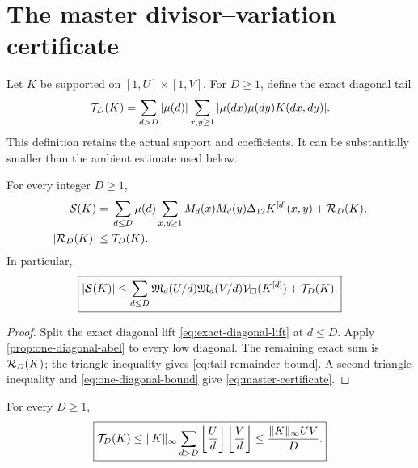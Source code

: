 \section{The master divisor--variation certificate}
\label{sec:master-certificate}

Let \(K\) be supported on
\([1,U]\times[1,V]\).  For \(D\ge1\), define the exact diagonal tail
\begin{equation}
 \mathcal T_D(K)
 =
 \sum_{d>D}|\mu(d)|
 \sum_{x,y\ge1}
 |\mu(dx)\mu(dy)K(dx,dy)|.
\label{eq:exact-diagonal-tail}
\end{equation}
This definition retains the actual support and coefficients.  It can be
substantially smaller than the ambient estimate used below.

\begin{theorem}
\label{thm:master-certificate}
For every integer \(D\ge1\),
\begin{align}
 \mathcal S(K)
 ={}&
 \sum_{d\le D}\mu(d)
 \sum_{x,y\ge1}
 M_d(x)M_d(y)\Delta_{12}K^{[d]}(x,y)
 +\mathcal R_D(K),
\label{eq:exact-truncated-expansion}\\
 |\mathcal R_D(K)|
 \le{}&\mathcal T_D(K).
\label{eq:tail-remainder-bound}
\end{align}
In particular,
\begin{equation}
 \boxed{
 |\mathcal S(K)|
 \le
 \sum_{d\le D}
 \mathfrak M_d(U/d)\mathfrak M_d(V/d)
 \mathcal V_\square(K^{[d]})
 +\mathcal T_D(K).}
\label{eq:master-certificate}
\end{equation}
\end{theorem}

\begin{proof}
Split the exact diagonal lift
\eqref{eq:exact-diagonal-lift} at \(d\le D\).  Apply
\cref{prop:one-diagonal-abel} to every low diagonal.  The remaining exact
sum is \(\mathcal R_D(K)\); the triangle inequality gives
\eqref{eq:tail-remainder-bound}.  A second triangle inequality and
\eqref{eq:one-diagonal-bound} give \eqref{eq:master-certificate}.
\end{proof}

\begin{proposition}
\label{prop:ambient-tail}
For every \(D\ge1\),
\begin{equation}
 \boxed{
 \mathcal T_D(K)
 \le
 \|K\|_\infty
 \sum_{d>D}\left\lfloor\frac Ud\right\rfloor
 \left\lfloor\frac Vd\right\rfloor
 \le
 \frac{\|K\|_\infty UV}{D}.}
\label{eq:ambient-tail}
\end{equation}
\end{proposition}

